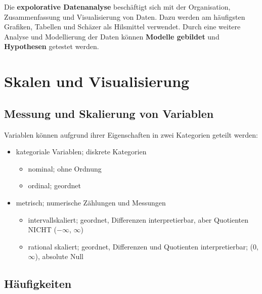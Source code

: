 \documentclass[
]{article}
\providecommand{\tightlist}{%
  \setlength{\itemsep}{0pt}\setlength{\parskip}{0pt}}
\begin{document}
Die \textbf{expolorative Datenanalyse} beschäftigt sich mit der
Organisation, Zusammenfassung und Visualisierung von Daten. Dazu werden
am häufigsten Grafiken, Tabellen und Schäzer als Hilsmittel verwendet.
Durch eine weitere Analyse und Modellierung der Daten können
\textbf{Modelle gebildet} und \textbf{Hypothesen} getestet werden.
\clearpage

\hypertarget{skalen-und-visualisierung}{%
\section{Skalen und Visualisierung}\label{skalen-und-visualisierung}}

\hypertarget{messung-und-skalierung-von-variablen}{%
\subsection{Messung und Skalierung von
Variablen}\label{messung-und-skalierung-von-variablen}}

Variablen können aufgrund ihrer Eigenschaften in zwei Kategorien geteilt
werden:

\begin{itemize}
\tightlist
\item
  kategoriale Variablen; diskrete Kategorien

  \begin{itemize}
  \tightlist
  \item
    nominal; ohne Ordnung
  \item
    ordinal; geordnet
  \end{itemize}
\item
  metrisch; numerische Zählungen und Messungen

  \begin{itemize}
  \tightlist
  \item
    intervallskaliert; geordnet, Differenzen interpretierbar, aber
    Quotienten NICHT (\(-\infty\), \(\infty\))
  \item
    rational skaliert; geordnet, Differenzen und Quotienten
    interpretierbar; (\(0\), \(\infty\)), absolute Null
  \end{itemize}
\end{itemize}

\hypertarget{huxe4ufigkeiten}{%
\subsection{Häufigkeiten}\label{huxe4ufigkeiten}}
\end{document}

